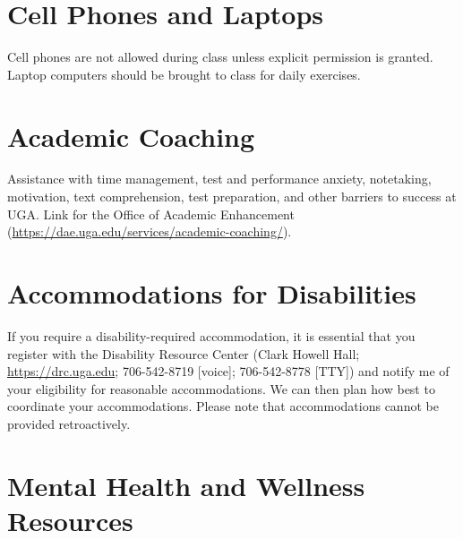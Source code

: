 \documentclass[12pt]{article}
\begin{document}
\vspace{-2mm}
\section*{\normalsize Cell Phones and Laptops}
\vspace{-4mm}
Cell phones are not allowed during class unless explicit permission is
granted. Laptop computers should be brought to class for daily
exercises.


\vspace{-2mm}
\section*{\normalsize Academic Coaching}
\vspace{-4mm}

Assistance with time management, test and performance anxiety,
notetaking, motivation, text comprehension, test preparation, and
other barriers to success at UGA. Link for the Office of Academic
Enhancement (\url{https://dae.uga.edu/services/academic-coaching/}). 

\vspace{-2mm}
\section*{\normalsize Accommodations for Disabilities}
\vspace{-4mm}

If you require a disability-required accommodation, it is essential
that you register with the Disability Resource Center (Clark Howell
Hall; \url{https://drc.uga.edu}; 706-542-8719 [voice]; 706-542-8778 [TTY])
and notify me of your eligibility for reasonable accommodations. We
can then plan how best to coordinate your accommodations. Please note
that accommodations cannot be provided retroactively.



\vspace{-2mm}
\section*{\normalsize Mental Health and Wellness Resources}
\vspace{-4mm}
\end{document}
